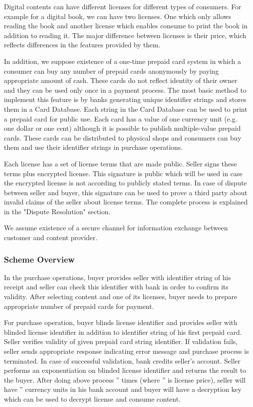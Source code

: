 \documentclass[times]{secauth}
\begin{document}
Digital contents can have different licenses for different types of consumers. For example for a digital book, we can have two licenses. One which only allows reading the book and another license which enables consume to print the book in addition to reading it. The major difference between licenses is their price, which reflects differences in the features provided by them.

In addition, we suppose existence of a one-time prepaid card system in which a consumer can buy any number of prepaid cards anonymously by paying appropriate amount of cash.
These cards do not reflect identity of their owner and they can be used only once in a payment process. The most basic method to implement this feature is by banks generating unique identifier strings and stores them in a Card Database. Each string in the Card Database can be used to print a prepaid card for public use. Each card has a value of one currency unit (e.g. one dollar or one cent) although it is possible to publish multiple-value prepaid cards. These cards can be distributed to physical shops and consumers can buy them and use their identifier strings in purchase operations.

Each license has a set of license terms that are made public. Seller signs these terms plus encrypted license. This signature is public which will be used in case the encrypted license is not according to publicly stated terms. In case of dispute between seller and buyer, this signature can be used to prove a third party about invalid claims of the seller about license terms. The complete process is explained in the "Dispute Resolution" section.

We assume existence of a secure channel for information exchange between customer and content provider.


\subsubsection{Scheme Overview}
In the purchase operations, buyer provides seller with identifier string of his receipt and seller can check this identifier with bank in order to confirm its validity.
After selecting content and one of its licenses, buyer needs to prepare appropriate number of prepaid cards for payment. 

For purchase operation, buyer blinds license identifier and provides seller with blinded license identifier in addition to identifier string of his first prepaid card. 
Seller verifies validity of given prepaid card string identifier. If validation fails, seller sends appropriate response indicating error message and purchase process is terminated. In case of successful validation, bank credits seller's account. Seller performs an exponentiation on blinded license identifier and returns the result to the buyer.
After doing above process '' times (where '' is license price), seller will have '' currency units in his bank account and buyer will have a decryption key which can be used to decrypt license and consume content.
\end{document}
